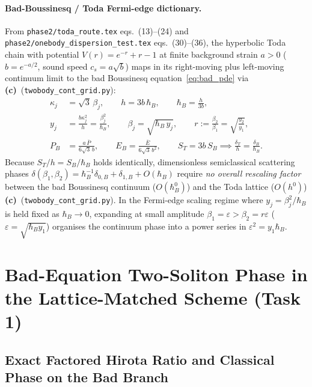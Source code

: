 \documentclass[11pt,a4paper]{article}
\newcommand{\Lc}{\textbf{(c)}}
\newcommand{\script}[1]{\texttt{#1}}
\begin{document}
\paragraph{Bad-Boussinesq / Toda Fermi-edge dictionary.}
From \texttt{phase2/toda\_route.tex} eqs.~(13)--(24) and \texttt{phase2/onebody\_dispersion\_test.tex} eqs.~(30)--(36), the hyperbolic Toda chain with potential $V(r)=e^{-r}+r-1$ at finite background strain $a>0$ ($b=e^{-a/2}$, sound speed $c_s=a\sqrt{b}$) maps in its right-moving plus left-moving continuum limit to the bad Boussinesq equation~\eqref{eq:bad_pde} via \Lc\ (\script{twobody\_cont\_grid.py}):
\begin{equation}\label{eq:toda_dict}
\begin{aligned}
\kappa_j&=\sqrt{3}\,\beta_j,\qquad h=3b\,\hbar_B,\qquad \hbar_B=\frac{h}{3b},\\
y_j&=\frac{b\kappa_j^2}{h}=\frac{\beta_j^2}{\hbar_B},\qquad \beta_j=\sqrt{\hbar_B\,y_j},\qquad r:=\frac{\beta_2}{\beta_1}=\sqrt{\frac{y_2}{y_1}},\\
P_B&=\frac{a\,\overline{P}}{6\sqrt{3}\,b},\qquad E_B=\frac{\overline{E}}{6\sqrt{3}\,b^2},\qquad S_T=3b\,S_B\implies \frac{\delta_T}{h}=\frac{\delta_B}{\hbar_B}.
\end{aligned}
\end{equation}
Because $S_T/h=S_B/\hbar_B$ holds identically, dimensionless semiclassical scattering phases $\delta(\beta_1,\beta_2)=\hbar_B^{-1}\delta_{0,B}+\delta_{1,B}+O(\hbar_B)$ require \emph{no overall rescaling factor} between the bad Boussinesq continuum ($O(\hbar_B^0)$) and the Toda lattice ($O(h^0)$) \Lc\ (\script{twobody\_cont\_grid.py}). In the Fermi-edge scaling regime where $y_j=\beta_j^2/\hbar_B$ is held fixed as $\hbar_B\to 0$, expanding at small amplitude $\beta_1=\varepsilon>\beta_2=r\varepsilon$ ($\varepsilon=\sqrt{\hbar_B y_1}$) organises the continuum phase into a power series in $\varepsilon^2=y_1\hbar_B$.

\section{Bad-Equation Two-Soliton Phase in the Lattice-Matched Scheme (Task 1)}

\subsection{Exact Factored Hirota Ratio and Classical Phase on the Bad Branch}
\end{document}
